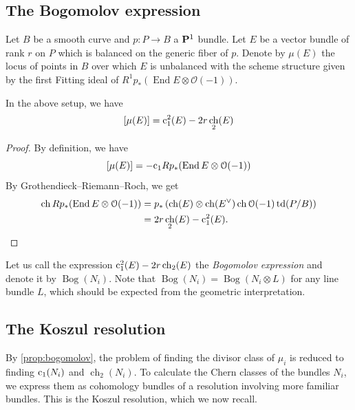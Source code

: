 \documentclass{amsart}
\DeclareMathOperator{\ch}{ch}
\renewcommand{\c}{{\rm c}}
\DeclareMathOperator{\td}{td}
\DeclareMathOperator{\Bog}{Bog}
\renewcommand{\O}{{\mathcal O}}
\renewcommand {\P}{{\bf P}}
\providecommand {\from}{{\colon}}
\providecommand{\End}{\operatorname{End}}
\numberwithin{equation}{section}
\begin{document}
\subsection{The Bogomolov expression}\label{sec:bog}
Let $B$ be a smooth curve and $p \from P \to B$ a $\P^1$ bundle.
Let $E$ be a vector bundle of rank $r$ on $P$ which is balanced on the generic fiber of $p$.
Denote by $\mu(E)$ the locus of points in $B$ over which $E$ is unbalanced with the scheme structure given by the first Fitting ideal of $R^1p_* (\End E \otimes \O(-1))$.
\begin{proposition}\label{prop:bogomolov}
  In the above setup, we have
  \[ [\mu(E)] = \c_1^2(E) - 2r\ch_2(E)\]
\end{proposition}
\begin{proof}
  By definition, we have
  \[ [\mu(E)] = -\c_1 Rp_*(\End E \otimes \O(-1))\]
  By Grothendieck--Riemann--Roch, we get
  \begin{align*}
    \ch Rp_*(\End E \otimes \O(-1)) &= p_* \left(\ch(E) \otimes \ch(E^\vee) \ch \O(-1) \td(P/B) \right)\\
    &= 2r\ch_2(E) - \c_1^2(E).
  \end{align*}
\end{proof}
Let us call the expression $\c_1^2(E) - 2r\ch_2(E)$ the \emph{Bogomolov expression} and denote it by $\Bog(N_i)$.
Note that $\Bog(N_i) = \Bog(N_i \otimes L)$ for any line bundle $L$, which should be expected from the geometric interpretation.

\subsection{The Koszul resolution}
By \autoref{prop:bogomolov}, the problem of finding the divisor class of $\mu_i$ is reduced to finding $\c_1(N_i)$ and $\ch_2(N_i)$.
To calculate the Chern classes of the bundles $N_i$, we express them as cohomology bundles of a resolution involving more familiar bundles.
This is the Koszul resolution, which we now recall.
\end{document}
